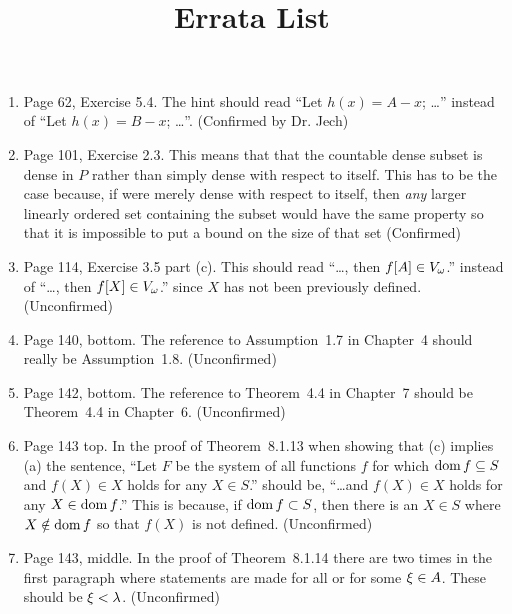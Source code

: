 \documentclass{report}
\title{
  \booktitle \\
  \ \\
  Errata List
}
\begin{document}
\maketitle

\begin{enumerate}

\item Page 62, Exercise 5.4. The hint should read ``Let $h(x) = A - x$; \ldots'' instead of ``Let $h(x) = B - x$; \ldots''.
  (Confirmed by Dr. Jech)

\item Page 101, Exercise 2.3. This means that that the countable dense subset is dense in $P$ rather than simply dense with respect to itself.
  This has to be the case because, if were merely dense with respect to itself, then \emph{any} larger linearly ordered set containing the subset would have the same property so that it is impossible to put a bound on the size of that set (Confirmed)

\item Page 114, Exercise 3.5 part (c). This should read ``\ldots, then $f[A] \in V_\omega$.'' instead of ``\ldots, then $f[X] \in V_\omega$.'' since $X$ has not been previously defined. (Unconfirmed)

\item Page 140, bottom. The reference to Assumption~1.7 in Chapter~4 should really be Assumption~1.8. (Unconfirmed)

\item Page 142, bottom. The reference to Theorem~4.4 in Chapter~7 should be Theorem~4.4 in Chapter~6. (Unconfirmed)

\item Page 143 top. In the proof of Theorem~8.1.13 when showing that (c) implies (a) the sentence, ``Let $F$ be the system of all functions $f$ for which $\mathrm{dom}\,{f} \subseteq S$ and $f(X) \in X$ holds for any $X \in S$.'' should be, ``\ldots and $f(X) \in X$ holds for any $X \in \mathrm{dom}\,{f}$.''
  This is because, if $\mathrm{dom}\,{f} \subset S$, then there is an $X \in S$ where $X \notin \mathrm{dom}\,{f}$ so that $f(X)$ is not defined. (Unconfirmed)

\item Page 143, middle. In the proof of Theorem~8.1.14 there are two times in the first paragraph where statements are made for all or for some $\xi \in A$.
  These should be $\xi < \lambda$. (Unconfirmed)
  
\end{enumerate}
\end{document}
